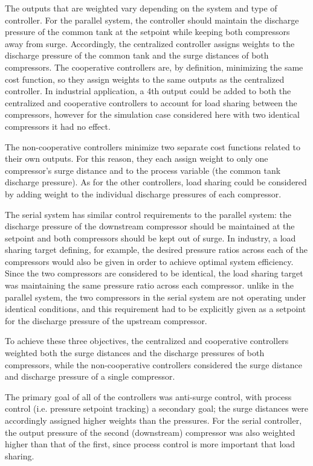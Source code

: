The outputs that are weighted vary depending on the system and type of controller.
For the parallel system, the controller should maintain the discharge pressure of the common tank at the setpoint while keeping both compressors away from surge.
Accordingly, the centralized controller assigns weights to the discharge pressure of the common tank and the surge distances of both compressors.
The cooperative controllers are, by definition, minimizing the same cost function, so they assign weights to the same outputs as the centralized controller.
In industrial application, a 4th output could be added to both the centralized and cooperative controllers to account for load sharing between the compressors, however for the simulation case considered here with two identical compressors it had no effect. 

The non-cooperative controllers minimize two separate cost functions related to their own outputs.
For this reason, they each assign weight to only one compressor's surge distance and to the process variable (the common tank discharge pressure).
As for the other controllers, load sharing could be considered by adding weight to the individual discharge pressures of each compressor. 

The serial system has similar control requirements to the parallel system: the discharge pressure of the downstream compressor should be maintained at the setpoint and both compressors should be kept out of surge.
In industry, a load sharing target defining, for example, the desired pressure ratios across each of the compressors would also be given in order to achieve optimal system efficiency.
Since the two compressors are considered to be identical, the load sharing target was maintaining the same pressure ratio across each compressor. 
unlike in the parallel system, the two compressors in the serial system are not operating under identical conditions, and this requirement had to be explicitly given as a setpoint for the discharge pressure of the upstream compressor.

To achieve these three objectives, the centralized and cooperative controllers weighted both the surge distances and the discharge pressures of both compressors, while the non-cooperative controllers considered the surge distance and discharge pressure of a single compressor.


The primary goal of all of the controllers was anti-surge control, with process control (i.e. pressure setpoint tracking) a secondary goal; the surge distances were accordingly assigned higher weights than the pressures.
For the serial controller, the output pressure of the second (downstream) compressor was also weighted higher than that of the first, since process control is more important that load sharing.

